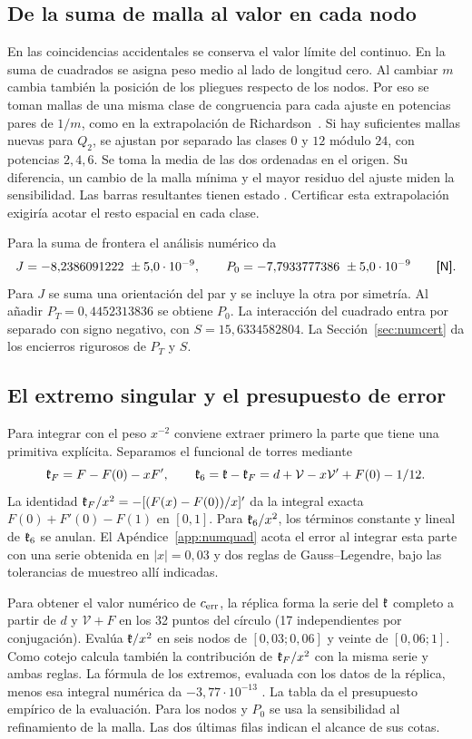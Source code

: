 \subsection{De la suma de malla al valor en cada nodo}
En las coincidencias accidentales se conserva el valor límite del continuo. En la suma de cuadrados
se asigna peso medio al lado de longitud cero. Al cambiar $m$ cambia también la posición de los
pliegues respecto de los nodos. Por eso se toman mallas de una misma clase de congruencia para
cada ajuste en potencias pares de $1/m$, como en la extrapolación de
Richardson~\cite{richardson}. Si hay suficientes mallas nuevas para $Q_2$, se ajustan por
separado las clases $0$ y $12$ módulo
$24$, con potencias $2,4,6$. Se toma la media de las dos ordenadas en el origen. Su
diferencia, un cambio de la malla mínima y el mayor residuo del ajuste miden la sensibilidad. Las
barras resultantes tienen estado . Certificar esta extrapolación exigiría acotar el resto espacial
en cada clase.

Para la suma de frontera el análisis numérico da
\[
 J=-8{,}2386091222\ \pm5{,}0\cdot10^{-9},\qquad
 P_0=-7{,}7933777386\ \pm5{,}0\cdot10^{-9}\qquad\text{\status{N}}.
\]
Para $J$ se suma una orientación del par y se incluye la otra por simetría. Al añadir
$P_T=0{,}4452313836$ se obtiene $P_0$. La interacción del cuadrado entra por separado con signo
negativo, con $S=15{,}6334582804$. La Sección~\ref{sec:numcert} da los encierros rigurosos
de $P_T$ y $S$.

\subsection{El extremo singular y el presupuesto de error}\label{sec:presupuesto}
Para integrar con el peso $x^{-2}$ conviene extraer primero la parte que tiene una primitiva
explícita. Separamos el funcional de torres mediante
\[
 \mathfrak{k}_F=F-F(0)-xF',\qquad
 \mathfrak{k}_6=\mathfrak{k}-\mathfrak{k}_F=d+\mathcal V-x\mathcal V'+F(0)-1/12.
\]
La identidad $\mathfrak{k}_F/x^2=-[(F(x)-F(0))/x]'$ da la integral exacta $F(0)+F'(0)-F(1)$ en $[0,1]$.
Para $\mathfrak{k}_6/x^2$, los términos constante y lineal de $\mathfrak{k}_6$ se anulan. El
Apéndice~\ref{app:numquad} acota el error al integrar esta parte con una serie obtenida en
$|x|=0{,}03$ y dos reglas de Gauss--Legendre, bajo las tolerancias de muestreo allí indicadas.

Para obtener el valor numérico de $c_{\mathrm{err}}$, la réplica forma la serie del $\mathfrak{k}$ completo a partir de
$d$ y $\mathcal V+F$ en los 32 puntos del círculo (17 independientes por conjugación).
Evalúa $\mathfrak{k}/x^2$ en seis nodos de $[0{,}03;0{,}06]$ y veinte de $[0{,}06;1]$. Como cotejo calcula
también la contribución de $\mathfrak{k}_F/x^2$ con la misma serie y ambas reglas. La fórmula de los extremos,
evaluada con los datos de la réplica, menos esa integral numérica da $-3{,}77\cdot10^{-13}$ .
La tabla da el presupuesto empírico  de la evaluación. Para los nodos y $P_0$ se usa la
sensibilidad al refinamiento de la malla. Las dos últimas filas indican el alcance de sus cotas.

